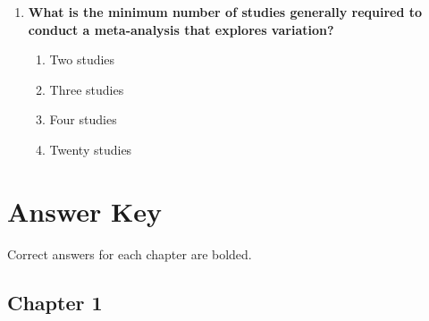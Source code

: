 \documentclass[
  letterpaper,
  DIV=11,
  numbers=noendperiod]{scrreprt}
\begin{document}
\begin{enumerate}
  \begin{enumerate}
  \def\labelenumii{\alph{enumii}.}
  \item
    It requires fewer participants to yield accurate results
  \item
    It eliminates the need for latent variables
  \item
    It allows the inclusion of multiple dependent variables and
    mediating variables
  \item
    It reduces data complexity by eliminating endogenous predictors
  \end{enumerate}
\item
  \textbf{What is the minimum number of studies generally required to
  conduct a meta-analysis that explores variation?}

  \begin{enumerate}
  \def\labelenumii{\alph{enumii}.}
  \item
    Two studies
  \item
    Three studies
  \item
    Four studies
  \item
    Twenty studies
  \end{enumerate}
\end{enumerate}


\chapter{Answer Key}\label{answer-key}

Correct answers for each chapter are bolded.

\section{Chapter 1}\label{chapter-1-1}
\end{document}

